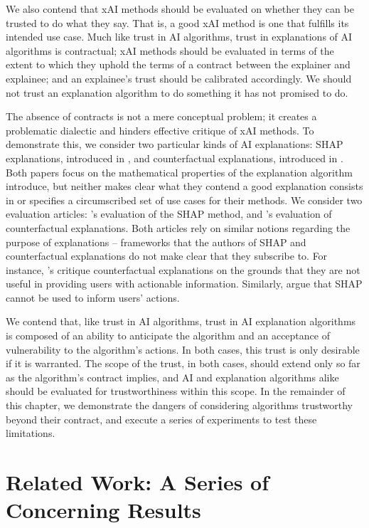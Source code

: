 We also contend that xAI methods should be evaluated on whether they can be trusted to do what they say. That is, a good xAI method is one that fulfills its intended use case. Much like trust in AI algorithms, trust in explanations of AI algorithms is contractual; xAI methods should be evaluated in terms of the extent to which they uphold the terms of a contract between the explainer and explainee; and an explainee's trust should be calibrated accordingly. We should not trust an explanation algorithm to do something it has not promised to do. 

The absence of contracts is not a mere conceptual problem; it creates a problematic dialectic and hinders effective critique of xAI methods. To demonstrate this, we consider two particular kinds of AI explanations: SHAP explanations, introduced in \textcite{lundberg_unified_2017}, and counterfactual explanations, introduced in \textcite{wachter_counterfactual_2017}. Both papers focus on the mathematical properties of the explanation algorithm introduce, but neither makes clear what they contend a good explanation consists in or specifies a circumscribed set of use cases for their methods. We consider two evaluation articles: \textcite{kumar_problems_2020}'s evaluation of the SHAP method, and \textcite{barocas_hidden_2020}'s evaluation of counterfactual explanations. Both articles rely on similar notions regarding the purpose of explanations – frameworks that the authors of SHAP and counterfactual explanations do not make clear that they subscribe to. For instance, \textcite{barocas_hidden_2020}'s critique counterfactual explanations on the grounds that they are not useful in providing users with actionable information. Similarly, \textcite{kumar_problems_2020} argue that SHAP cannot be used to inform users' actions.

We contend that, like trust in AI algorithms, trust in AI explanation algorithms is composed of an ability to anticipate the algorithm and an acceptance of vulnerability to the algorithm's actions. In both cases, this trust is only desirable if it is warranted. The scope of the trust, in both cases, should extend only so far as the algorithm's contract implies, and AI and explanation algorithms alike should be evaluated for trustworthiness within this scope. In the remainder of this chapter, we demonstrate the dangers of considering algorithms trustworthy beyond their contract, and execute a series of experiments to test these limitations.

\section{Related Work: A Series of Concerning Results}
